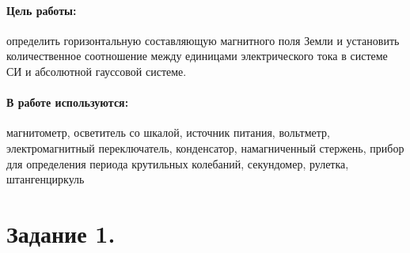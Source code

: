 \documentclass{physlab}
\begin{document}

	
	\paragraph{Цель работы:} определить горизонтальную составляющую магнитного поля Земли и установить количественное соотношение между единицами электрического тока в системе СИ и абсолютной гауссовой системе.
	\paragraph{В работе используются:} магнитометр, осветитель со шкалой, источник питания, вольтметр, электромагнитный переключатель, конденсатор, намагниченный стержень, прибор для определения периода крутильных колебаний, секундомер, рулетка, штангенциркуль
	\section*{Задание 1.}
\end{document}

